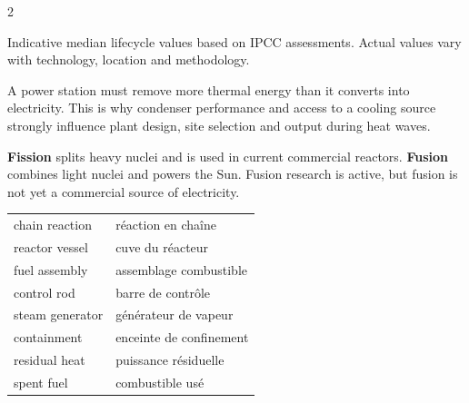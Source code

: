 \begin{multicols}{2}
\begin{tcolorbox}[title=\sffamily\bfseries Indicative lifecycle emissions,
colback=white,colframe=ECBlue]
\centering
{}

{\scriptsize Indicative median lifecycle values based on IPCC assessments. Actual values
vary with technology, location and methodology.}
\end{tcolorbox}

\begin{tcolorbox}[title=\sffamily\bfseries Engineering Insight,colback=white,colframe=ECOrange]
A power station must remove more thermal energy than it converts into electricity. This is
why condenser performance and access to a cooling source strongly influence plant design,
site selection and output during heat waves.
\end{tcolorbox}

\begin{tcolorbox}[title=\sffamily\bfseries Fission and fusion,colback=white,colframe=ECBlue]
\textbf{Fission} splits heavy nuclei and is used in current commercial reactors.
\textbf{Fusion} combines light nuclei and powers the Sun. Fusion research is active, but
fusion is not yet a commercial source of electricity.
\end{tcolorbox}

\begin{vocabulary}
\begin{tabularx}{\linewidth}{@{}lX@{}}
chain reaction & réaction en chaîne\\
reactor vessel & cuve du réacteur\\
fuel assembly & assemblage combustible\\
control rod & barre de contrôle\\
steam generator & générateur de vapeur\\
containment & enceinte de confinement\\
residual heat & puissance résiduelle\\
spent fuel & combustible usé
\end{tabularx}
\end{vocabulary}


\end{multicols}
